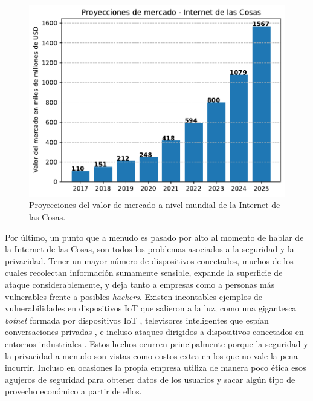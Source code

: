 \begin{figure}[h]
\centering
\includegraphics[width=\textwidth]{./Figures/iot_market_projection.pdf}
\caption[Proyecciones del valor de mercado a nivel mundial de la Internet de las Cosas.]{Proyecciones del valor de mercado a nivel mundial de la Internet de las Cosas.\footnotemark}
\label{fig:iot_market}
\end{figure}



Por último, un punto que a menudo es pasado por alto al momento de hablar de la Internet de las Cosas, son todos los problemas asociados a la seguridad y la privacidad. Tener un mayor número de dispositivos conectados, muchos de los cuales recolectan información sumamente sensible, expande la superficie de ataque considerablemente, y deja tanto a empresas como a personas más vulnerables frente a posibles \emph{hackers}. Existen incontables ejemplos de vulnerabilidades en dispositivos IoT que salieron a la luz, como una gigantesca \emph{botnet} formada por dispositivos IoT \citep{3}, televisores inteligentes que espían conversaciones privadas \citep{4}, e incluso ataques dirigidos a dispositivos conectados en entornos industriales \citep{5}. Estos hechos ocurren principalmente porque la seguridad y la privacidad a menudo son vistas como costos extra en los que no vale la pena incurrir. Incluso en ocasiones la propia empresa utiliza de manera poco ética esos agujeros de seguridad para obtener datos de los usuarios y sacar algún tipo de provecho económico a partir de ellos.

